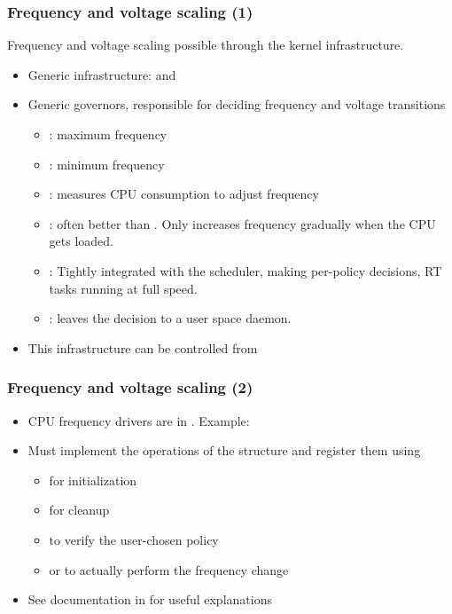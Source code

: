 \begin{frame}
  \frametitle{Frequency and voltage scaling (1)}
  Frequency and voltage scaling possible through the
   kernel infrastructure.
  \begin{itemize}
  \item Generic infrastructure:  and
  \item Generic governors, responsible for deciding frequency and
    voltage transitions
    \begin{itemize}
    \item {}: maximum frequency
    \item {}: minimum frequency
    \item {}: measures CPU consumption to adjust frequency
    \item {}: often better than
      . Only increases frequency gradually when the
      CPU gets loaded.
    \item {}: Tightly integrated with the scheduler, making per-policy decisions, RT tasks running at full speed.
    \item {}: leaves the decision to a user space
      daemon.
    \end{itemize}
  \item This infrastructure can be controlled from
  \end{itemize}
\end{frame}

\begin{frame}
  \frametitle{Frequency and voltage scaling (2)}
  \begin{itemize}
  \item CPU frequency drivers are in .  Example:
  \item Must implement the operations of the 
    structure and register them using 
    \begin{itemize}
    \item {} for initialization
    \item {} for cleanup
    \item {} to verify the user-chosen policy
    \item {} or  to actually perform
      the frequency change
    \end{itemize}
  \item See documentation in  for useful explanations
  \end{itemize}
\end{frame}

